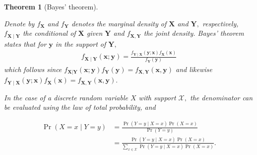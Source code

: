 \documentclass[
  11pt,
  letterpaper,
]{scrbook}
\theoremstyle{definition}
\theoremstyle{plain}
\theoremstyle{plain}
\newtheorem{theorem}{Theorem}[chapter]
\theoremstyle{plain}
\theoremstyle{definition}
\theoremstyle{definition}
\theoremstyle{plain}
\theoremstyle{plain}
\theoremstyle{remark}
\begin{document}
\begin{theorem}[Bayes'
theorem]\protect\hypertarget{thm-Bayes}{}\label{thm-Bayes}

Denote by \(f_{\boldsymbol{X}}\) and \(f_{\boldsymbol{Y}}\) denotes the
marginal density of \(\boldsymbol{X}\) and \(\boldsymbol{Y},\)
respectively, \(f_{\boldsymbol{X} \mid \boldsymbol{Y}}\) the conditional
of \(\boldsymbol{X}\) given \(\boldsymbol{Y}\) and
\(f_{\boldsymbol{X},\boldsymbol{Y}}\) the joint density. Bayes' theorem
states that for \(\boldsymbol{y}\) in the support of \(\boldsymbol{Y},\)
\begin{align*}
f_{\boldsymbol{X}\mid \boldsymbol{Y}}(\boldsymbol{x}; \boldsymbol{y}) = \frac{f_{\boldsymbol{Y}\mid \boldsymbol{X}}(\boldsymbol{y}; \boldsymbol{x})f_{\boldsymbol{X}}(\boldsymbol{x})}{f_{\boldsymbol{Y}}(\boldsymbol{y})}
\end{align*} which follows since
\(f_{\boldsymbol{X}|\boldsymbol{Y}}(\boldsymbol{x}; \boldsymbol{y})f_{\boldsymbol{Y}}(\boldsymbol{y}) = f_{\boldsymbol{X},\boldsymbol{Y}}(\boldsymbol{x},\boldsymbol{y})\)
and likewise
\(f_{\boldsymbol{Y} \mid \boldsymbol{X}}(\boldsymbol{y}; \boldsymbol{x})f_{\boldsymbol{X}}(\boldsymbol{x}) = f_{\boldsymbol{X},\boldsymbol{Y}}(\boldsymbol{x},\boldsymbol{y}).\)

In the case of a discrete random variable \(X\) with support
\(\mathcal{X},\) the denominator can be evaluated using the law of total
probability, and

\begin{align*}
\Pr(X = x \mid Y=y) &= \frac{\Pr(Y=y \mid X=x)\Pr(X=x)}{\Pr(Y=y)} \\&= \frac{\Pr(Y=y \mid X=x)\Pr(X=x)}{\sum_{x \in \mathcal{X}}\Pr(Y =y \mid X=x)\Pr(X=x)}.
\end{align*}

\end{theorem}
\end{document}
